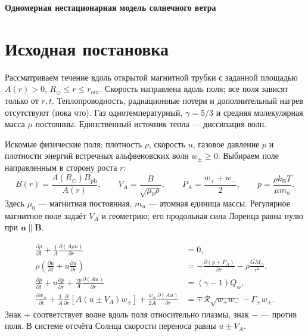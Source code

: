 \documentclass[11pt,a4paper]{article}
\newcommand{\PA}{P_A}
\newcommand{\VA}{V_A}
\newcommand{\Rref}{\mathcal R}
\newcommand{\ph}{\mathrm{ph}}
\begin{document}
\begin{center}
{\Large\bfseries Одномерная нестационарная модель солнечного ветра}\\[4pt]
\end{center}

\section{Исходная постановка}

Рассматриваем течение вдоль открытой магнитной трубки
с заданной площадью $A(r)>0$,
$R_\odot\le r\le r_{\mathrm{out}}$.
Скорость направлена вдоль поля; все поля зависят только от $r,t$.
Теплопроводность, радиационные потери и дополнительный нагрев отсутствуют (пока что).
Газ однотемпературный, $\gamma=5/3$ и средняя молекулярная масса
$\mu$ постоянны. Единственный источник тепла --- диссипация волн.

Искомые физические поля: плотность $\rho$, скорость $u$,
газовое давление $p$ и плотности энергий встречных альфвеновских
волн $w_\pm\ge0$. Выбираем поле направленным в сторону роста $r$:
\[
 B(r)=\frac{A(R_\odot)B_\ph}{A(r)},\qquad
 \VA=\frac{B}{\sqrt{\mu_0\rho}},\qquad
 \PA=\frac{w_++w_-}{2},\qquad
 p=\frac{\rho k_{\mathrm B}T}{\mu m_u}.
\]
Здесь $\mu_0$ --- магнитная постоянная, $m_u$ --- атомная единица массы.
Регулярное магнитное поле задаёт $\VA$ и геометрию;
его продольная сила Лоренца равна нулю при $\bm u\parallel\bm B$.

\begin{equation}
\begin{aligned}
 \frac{\partial\rho}{\partial t}+\frac1A\frac{\partial(A\rho u)}{\partial r}&=0,\\[3pt]
 \rho\left(\frac{\partial u}{\partial t}+u\frac{\partial u}{\partial r}\right)
 &=-\frac{\partial(p+\PA)}{\partial r}-\rho\frac{GM_\odot}{r^2},\\[3pt]
 \frac{\partial p}{\partial t}+u\frac{\partial p}{\partial r}+
 \frac{\gamma p}{A}\frac{\partial(Au)}{\partial r}&=(\gamma-1)Q_w,\\[3pt]
 \frac{\partial w_\pm}{\partial t}+\frac1A\frac{\partial}{\partial r}\!\left[A(u\pm\VA)w_\pm\right]
 +\frac{w_\pm}{2A}\frac{\partial(Au)}{\partial r}
 &=\mp\Rref\sqrt{w_+w_-}-\Gamma_\pm w_\pm.
\end{aligned}
\label{eq:primitive}
\end{equation}
Знак $+$ соответствует волне вдоль поля относительно плазмы,
знак $-$ --- против поля. В системе отсчёта Солнца скорости переноса
равны $u\pm\VA$.
\end{document}

